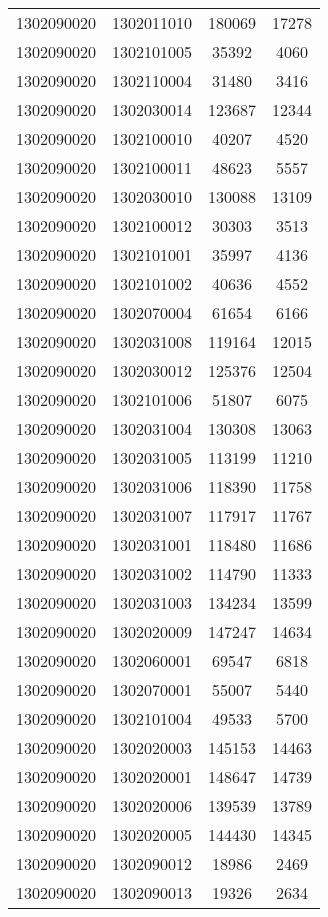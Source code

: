 \begin{longtable}[h]{llcc}
		1302090020 & 1302011010 & 180069 & 17278\\
		1302090020 & 1302101005 & 35392 & 4060\\
		1302090020 & 1302110004 & 31480 & 3416\\
		1302090020 & 1302030014 & 123687 & 12344\\
		1302090020 & 1302100010 & 40207 & 4520\\
		1302090020 & 1302100011 & 48623 & 5557\\
		1302090020 & 1302030010 & 130088 & 13109\\
		1302090020 & 1302100012 & 30303 & 3513\\
		1302090020 & 1302101001 & 35997 & 4136\\
		1302090020 & 1302101002 & 40636 & 4552\\
		1302090020 & 1302070004 & 61654 & 6166\\
		1302090020 & 1302031008 & 119164 & 12015\\
		1302090020 & 1302030012 & 125376 & 12504\\
		1302090020 & 1302101006 & 51807 & 6075\\
		1302090020 & 1302031004 & 130308 & 13063\\
		1302090020 & 1302031005 & 113199 & 11210\\
		1302090020 & 1302031006 & 118390 & 11758\\
		1302090020 & 1302031007 & 117917 & 11767\\
		1302090020 & 1302031001 & 118480 & 11686\\
		1302090020 & 1302031002 & 114790 & 11333\\
		1302090020 & 1302031003 & 134234 & 13599\\
		1302090020 & 1302020009 & 147247 & 14634\\
		1302090020 & 1302060001 & 69547 & 6818\\
		1302090020 & 1302070001 & 55007 & 5440\\
		1302090020 & 1302101004 & 49533 & 5700\\
		1302090020 & 1302020003 & 145153 & 14463\\
		1302090020 & 1302020001 & 148647 & 14739\\
		1302090020 & 1302020006 & 139539 & 13789\\
		1302090020 & 1302020005 & 144430 & 14345\\
		1302090020 & 1302090012 & 18986 & 2469\\
		1302090020 & 1302090013 & 19326 & 2634\\

\end{longtable}
